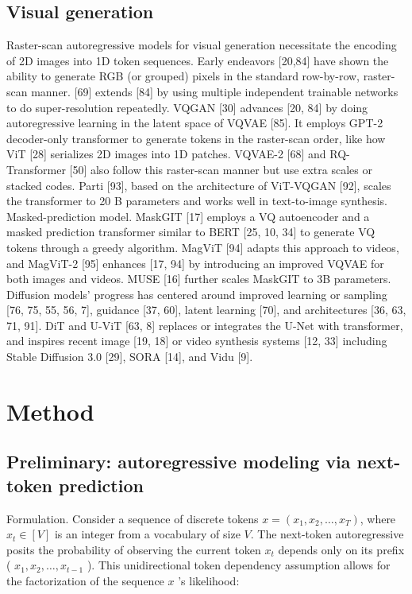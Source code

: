 \documentclass{article}
\begin{document}
\subsection*{Visual generation}
Raster-scan autoregressive models for visual generation necessitate the encoding of 2D images into 1D token sequences. Early endeavors [20,84] have shown the ability to generate RGB (or grouped) pixels in the standard row-by-row, raster-scan manner. [69] extends [84] by using multiple independent trainable networks to do super-resolution repeatedly. VQGAN [30] advances [20, 84] by doing autoregressive learning in the latent space of VQVAE [85]. It employs GPT-2 decoder-only transformer to generate tokens in the raster-scan order, like how ViT [28] serializes 2D images into 1D patches. VQVAE-2 [68] and RQ-Transformer [50] also follow this raster-scan manner but use extra scales or stacked codes. Parti [93], based on the architecture of ViT-VQGAN [92], scales the transformer to 20 B parameters and works well in text-to-image synthesis.\\[0pt]
Masked-prediction model. MaskGIT [17] employs a VQ autoencoder and a masked prediction transformer similar to BERT [25, 10, 34] to generate VQ tokens through a greedy algorithm. MagViT [94] adapts this approach to videos, and MagViT-2 [95] enhances [17, 94] by introducing an improved VQVAE for both images and videos. MUSE [16] further scales MaskGIT to 3B parameters.\\[0pt]
Diffusion models' progress has centered around improved learning or sampling [76, 75, 55, 56, 7], guidance [37, 60], latent learning [70], and architectures [36, 63, 71, 91]. DiT and U-ViT [63, 8] replaces or integrates the U-Net with transformer, and inspires recent image [19, 18] or video synthesis systems [12, 33] including Stable Diffusion 3.0 [29], SORA [14], and Vidu [9].

\section*{Method}
\subsection*{Preliminary: autoregressive modeling via next-token prediction}
Formulation. Consider a sequence of discrete tokens $x=\left(x_{1}, x_{2}, \ldots, x_{T}\right)$, where $x_{t} \in[V]$ is an integer from a vocabulary of size $V$. The next-token autoregressive posits the probability of observing the current token $x_{t}$ depends only on its prefix ( $x_{1}, x_{2}, \ldots, x_{t-1}$ ). This unidirectional token dependency assumption allows for the factorization of the sequence $x$ 's likelihood:
\end{document}

